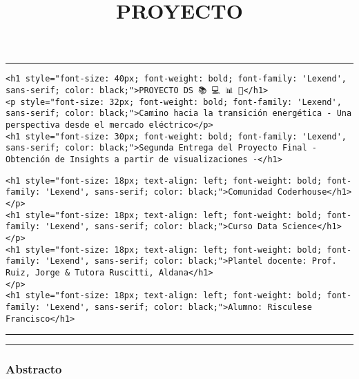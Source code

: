 \documentclass[11pt]{article}
\title{PROYECTO}
\begin{document}
    
    \maketitle
    
    

    
    \begin{center}\rule{0.5\linewidth}{0.5pt}\end{center}

\begin{verbatim}
<h1 style="font-size: 40px; font-weight: bold; font-family: 'Lexend', sans-serif; color: black;">PROYECTO DS 📚 💻 📊 🧪</h1>
<p style="font-size: 32px; font-weight: bold; font-family: 'Lexend', sans-serif; color: black;">Camino hacia la transición energética - Una perspectiva desde el mercado eléctrico</p>
<h1 style="font-size: 30px; font-weight: bold; font-family: 'Lexend', sans-serif; color: black;">Segunda Entrega del Proyecto Final - Obtención de Insights a partir de visualizaciones -</h1>
\end{verbatim}

\begin{verbatim}
<h1 style="font-size: 18px; text-align: left; font-weight: bold; font-family: 'Lexend', sans-serif; color: black;">Comunidad Coderhouse</h1>
</p>
<h1 style="font-size: 18px; text-align: left; font-weight: bold; font-family: 'Lexend', sans-serif; color: black;">Curso Data Science</h1>
</p>
<h1 style="font-size: 18px; text-align: left; font-weight: bold; font-family: 'Lexend', sans-serif; color: black;">Plantel docente: Prof. Ruiz, Jorge & Tutora Ruscitti, Aldana</h1>
</p>
<h1 style="font-size: 18px; text-align: left; font-weight: bold; font-family: 'Lexend', sans-serif; color: black;">Alumno: Risculese Francisco</h1>
\end{verbatim}

\begin{center}\rule{0.5\linewidth}{0.5pt}\end{center}

    \begin{center}\rule{0.5\linewidth}{0.5pt}\end{center}

\hypertarget{abstracto}{%
\subsubsection{Abstracto}\label{abstracto}}
\end{document}
